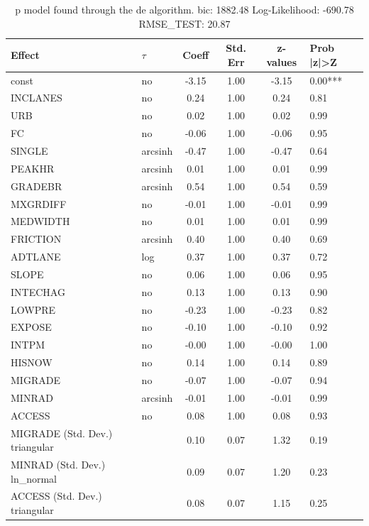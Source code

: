\begin{table}
	\caption{p model found through the de algorithm. bic: 1882.48 Log-Likelihood: -690.78 RMSE_TEST: 20.87}
	\begin{center}
		\begin{tabular}{|l|l|c|c|c|l|}
			\hline
			Effect & $\tau$ & Coeff & Std. Err & z-values & Prob |z|>Z \\
			\hline
			const & no & -3.15 & 1.00 & -3.15 & 0.00*** \\
			\hline
			INCLANES & no & 0.24 & 1.00 & 0.24 & 0.81 \\
			\hline
			URB & no & 0.02 & 1.00 & 0.02 & 0.99 \\
			\hline
			FC & no & -0.06 & 1.00 & -0.06 & 0.95 \\
			\hline
			SINGLE & arcsinh & -0.47 & 1.00 & -0.47 & 0.64 \\
			\hline
			PEAKHR & arcsinh & 0.01 & 1.00 & 0.01 & 0.99 \\
			\hline
			GRADEBR & arcsinh & 0.54 & 1.00 & 0.54 & 0.59 \\
			\hline
			MXGRDIFF & no & -0.01 & 1.00 & -0.01 & 0.99 \\
			\hline
			MEDWIDTH & no & 0.01 & 1.00 & 0.01 & 0.99 \\
			\hline
			FRICTION & arcsinh & 0.40 & 1.00 & 0.40 & 0.69 \\
			\hline
			ADTLANE & log & 0.37 & 1.00 & 0.37 & 0.72 \\
			\hline
			SLOPE & no & 0.06 & 1.00 & 0.06 & 0.95 \\
			\hline
			INTECHAG & no & 0.13 & 1.00 & 0.13 & 0.90 \\
			\hline
			LOWPRE & no & -0.23 & 1.00 & -0.23 & 0.82 \\
			\hline
			EXPOSE & no & -0.10 & 1.00 & -0.10 & 0.92 \\
			\hline
			INTPM & no & -0.00 & 1.00 & -0.00 & 1.00 \\
			\hline
			HISNOW & no & 0.14 & 1.00 & 0.14 & 0.89 \\
			\hline
			MIGRADE & no & -0.07 & 1.00 & -0.07 & 0.94 \\
			\hline
			MINRAD & arcsinh & -0.01 & 1.00 & -0.01 & 0.99 \\
			\hline
			ACCESS & no & 0.08 & 1.00 & 0.08 & 0.93 \\
			\hline
			MIGRADE (Std. Dev.) triangular &  & 0.10 & 0.07 & 1.32 & 0.19 \\
			\hline
			MINRAD (Std. Dev.) ln_normal &  & 0.09 & 0.07 & 1.20 & 0.23 \\
			\hline
			ACCESS (Std. Dev.) triangular &  & 0.08 & 0.07 & 1.15 & 0.25 \\
			\hline
		\end{tabular}
	\end{center}
\end{table}